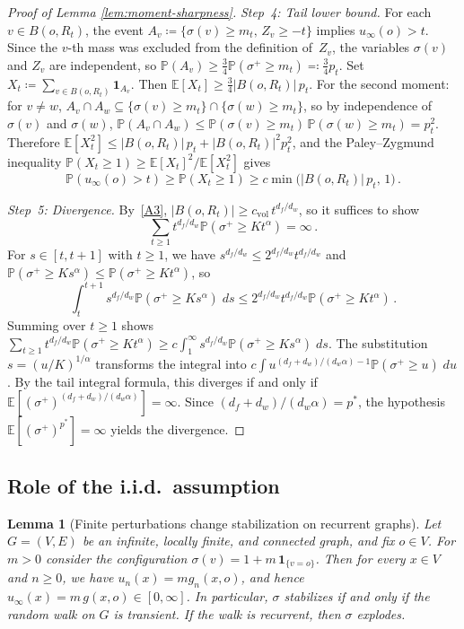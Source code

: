 \documentclass[11pt]{amsart}
\theoremstyle{plain}
\newtheorem{lemma}[theorem]{Lemma}
\theoremstyle{definition}
\newcommand{\E}{\mathbb{E}}
\renewcommand{\P}{\mathbb{P}}
\newcommand{\one}{\mathbf{1}}
\begin{document}
\begin{proof}[Proof of Lemma \ref{lem:moment-sharpness}]
		\emph{Step~4: Tail lower bound.}  For each $v\in B(o,R_t)$, the event $A_v\coloneqq\{\sigma(v)\geq m_t,\,Z_v\geq -t\}$ implies $u_\infty(o)>t$. Since the $v$-th mass was excluded from the definition of~$Z_v$, the variables $\sigma(v)$ and $Z_v$ are independent, so $\P(A_v)\geq\frac{3}{4}\P(\sigma^+\geq m_t)\eqqcolon\frac{3}{4}p_t$. Set $X_t\coloneqq\sum_{v\in B(o,R_t)}\one_{A_v}$. Then $\E[X_t]\geq\frac{3}{4}|B(o,R_t)|\,p_t$. For the second moment: for $v\neq w$, $A_v\cap A_w\subseteq\{\sigma(v)\geq m_t\}\cap\{\sigma(w)\geq m_t\}$, so by independence of $\sigma(v)$ and $\sigma(w)$, $\P(A_v\cap A_w)\leq\P(\sigma(v)\geq m_t)\,\P(\sigma(w)\geq m_t)=p_t^2$. Therefore $\E[X_t^2]\leq|B(o,R_t)|\,p_t+|B(o,R_t)|^2 p_t^2$, and the Paley--Zygmund inequality $\P(X_t\geq 1)\geq\E[X_t]^2/\E[X_t^2]$ gives
		\begin{equation}\label{eq:tail-lb}
			\P(u_\infty(o)>t)\geq\P(X_t\geq 1)\geq c\min\bigl(|B(o,R_t)|\,p_t,\,1\bigr)\,.
		\end{equation}
		
		\emph{Step~5: Divergence.}  By~\ref{A3}, $|B(o,R_t)|\geq c_{\mathrm{vol}}\,t^{d_f/d_w}$, so it suffices to show
		\[
		\sum_{t\geq 1}t^{d_f/d_w}\P(\sigma^+\geq Kt^{\alpha})=\infty\,.
		\] For $s\in[t,t+1]$ with $t\geq 1$, we have $s^{d_f/d_w}\leq 2^{d_f/d_w}t^{d_f/d_w}$ and $\P(\sigma^+\geq Ks^{\alpha})\leq\P(\sigma^+\geq Kt^{\alpha})$, so
		\[
		\int_t^{t+1}s^{d_f/d_w}\P(\sigma^+\geq Ks^{\alpha})\; ds\leq 2^{d_f/d_w}t^{d_f/d_w}\P(\sigma^+\geq Kt^{\alpha})\,.
		\]
		Summing over $t\geq 1$ shows $\sum_{t\geq 1}t^{d_f/d_w}\P(\sigma^+\geq Kt^{\alpha})\geq c\int_1^{\infty} s^{d_f/d_w}\P(\sigma^+\geq Ks^{\alpha})\; ds$.  The substitution $s=(u/K)^{1/\alpha}$ transforms the integral into $c\int u^{(d_f+d_w)/(d_w\alpha)-1}\P(\sigma^+\geq u)\; du$.  By the tail integral formula, this diverges if and only if $\E[(\sigma^+)^{(d_f+d_w)/(d_w\alpha)}]=\infty$.  Since $(d_f+d_w)/(d_w\alpha)=p^*$, the hypothesis $\E[(\sigma^+)^{p^*}]=\infty$ yields the divergence.
	\end{proof}
	
	\subsection{Role of the i.i.d.\ assumption}
	
	\begin{lemma}[Finite perturbations change stabilization on recurrent graphs]\label{ex:finite-perturbation}
		Let $G=(V,E)$ be an infinite, locally finite, and connected graph, and fix $o\in V$. For $m>0$ consider the configuration $\sigma(v)=1+m\,\one_{\{v=o\}}$.
		Then for every $x\in V$ and $n\geq 0$, we have $u_n(x)=m g_n(x,o)$, and hence $u_\infty(x)=m\,g(x,o)\in[0,\infty]$. In particular, $\sigma$ stabilizes if and only if the random walk on $G$ is transient. If the walk is recurrent, then $\sigma$ explodes.
	\end{lemma}
	
\end{document}
